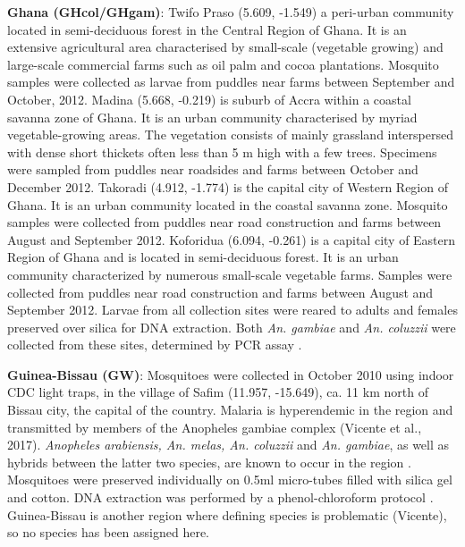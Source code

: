 \documentclass[a4paper,11pt,abstracton,hidelinks]{scrartcl}
\begin{document}
%
\textbf{Ghana (GHcol/GHgam)}: Twifo Praso (5.609, -1.549) a peri-urban community located in semi-deciduous forest in the Central Region of Ghana.
%
It is an extensive agricultural area characterised by small-scale (vegetable growing) and large-scale commercial farms such as oil palm and cocoa plantations.
%
Mosquito samples were collected as larvae from puddles near farms between September and October, 2012.
%
Madina (5.668,	-0.219) is suburb of Accra within a coastal savanna zone of Ghana. 
%
It is an urban community characterised by myriad vegetable-growing areas.
%
The vegetation consists of mainly grassland interspersed with dense short thickets often less than 5 m high with a few trees.
%
Specimens were sampled from puddles near roadsides and farms between October and December 2012.
%
Takoradi (4.912, -1.774) is the capital city of Western Region of Ghana.
%
It is an urban community located in the coastal savanna zone.
%
Mosquito samples were collected from puddles near road construction and farms between August and September 2012.
%
Koforidua (6.094, -0.261) is a capital city of Eastern Region of Ghana and is located in semi-deciduous forest. 
%
It is an urban community characterized by numerous small-scale vegetable farms. 
%
Samples were collected from puddles near road construction and farms between August and September 2012.
%
Larvae from all collection sites were reared to adults and females preserved over silica for DNA extraction.
%
Both \textit{An. gambiae} and \textit{An. coluzzii} were collected from these sites, determined by PCR assay \cite{Santolamazza2008}.

%
\textbf{Guinea-Bissau (GW)}: Mosquitoes were collected in October 2010 using indoor CDC light traps, in the village of Safim (11.957, -15.649), ca. 11 km north of Bissau city, the capital of the country.
%
Malaria is hyperendemic in the region and transmitted by members of the Anopheles gambiae complex (Vicente et al., 2017).
%
\textit{Anopheles arabiensis, An. melas, An. coluzzii} and \textit{An. gambiae}, as well as hybrids between the latter two species, are known to occur in the region \cite{Gordicho2014, Vicente2017}.
%
Mosquitoes were preserved individually on 0.5ml micro-tubes filled with silica gel and cotton. DNA extraction was performed by a phenol-chloroform protocol \cite{Donnelly1999}.
%
Guinea-Bissau is another region where defining species is problematic (Vicente), so no species has been assigned here.

\end{document}

